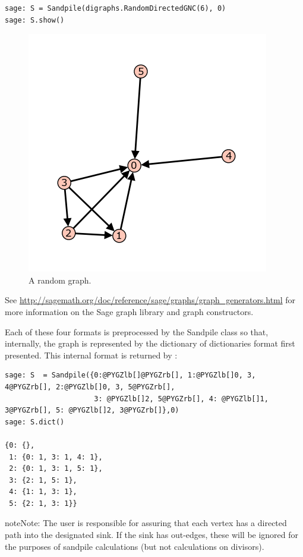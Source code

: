 \documentclass[letterpaper,10pt,english]{manual}
\begin{document}
\begin{Verbatim}[commandchars=@\[\]]
sage: S = Sandpile(digraphs.RandomDirectedGNC(6), 0)
sage: S.show()
\end{Verbatim}
\begin{figure}[htbp]
\centering

\includegraphics{random.png}
\caption{A random graph.}\end{figure}

See \href{http://sagemath.org/doc/reference/sage/graphs/graph\_generators.html}{http://sagemath.org/doc/reference/sage/graphs/graph\_generators.html} for
more information on the Sage graph library and graph constructors.

Each of these four formats is preprocessed by the Sandpile class so that,
internally, the graph is represented by the dictionary of dictionaries format
first presented.  This internal format is returned by  :

\begin{Verbatim}[commandchars=@\[\]]
sage: S  = Sandpile({0:@PYGZlb[]@PYGZrb[], 1:@PYGZlb[]0, 3, 4@PYGZrb[], 2:@PYGZlb[]0, 3, 5@PYGZrb[],
                     3: @PYGZlb[]2, 5@PYGZrb[], 4: @PYGZlb[]1, 3@PYGZrb[], 5: @PYGZlb[]2, 3@PYGZrb[]},0)
sage: S.dict()

{0: {},
 1: {0: 1, 3: 1, 4: 1},
 2: {0: 1, 3: 1, 5: 1},
 3: {2: 1, 5: 1},
 4: {1: 1, 3: 1},
 5: {2: 1, 3: 1}}
\end{Verbatim}

\begin{notice}{note}{Note:}
The user is responsible for assuring that each vertex has a directed path
into the designated sink.  If the sink has out-edges, these will be ignored
for the purposes of sandpile calculations (but not calculations on divisors).
\end{notice}
\end{document}
